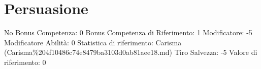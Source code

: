 \section{Persuasione}\label{persuasione}

\begin{description}
\tightlist
\item[Tags: ABI]
No Bonus Competenza: 0 Bonus Competenza di Riferimento: 1 Modificatore:
-5 Modificatore Abilità: 0 Statistica di riferimento: Carisma
(Carisma\%204f10486c74e8479ba3103d0ab81aee18.md) Tiro Salvezza: -5
Valore di riferimento: 0
\end{description}
